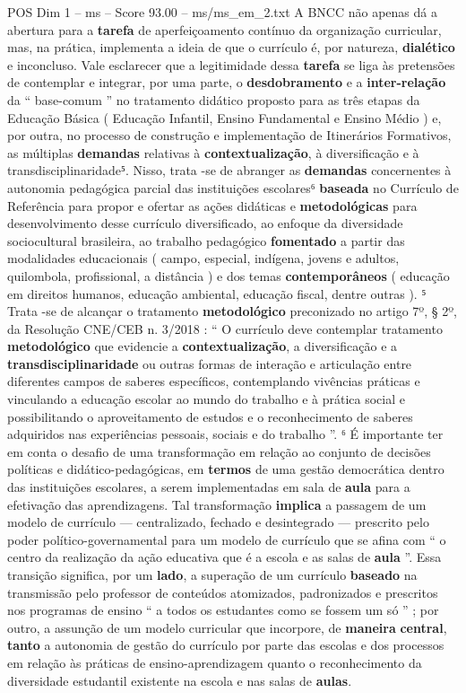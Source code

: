 \begin{textsample}{POS Dim 1 – ms – Score 93.00 – ms/ms\_em\_2.txt}
A BNCC não apenas dá a abertura para a \textbf{tarefa} de aperfeiçoamento contínuo da organização curricular, mas, na prática, implementa a ideia de que o currículo é, por natureza, \textbf{dialético} e inconcluso.
Vale esclarecer que a legitimidade dessa \textbf{tarefa} se liga às pretensões de contemplar e integrar, por uma parte, o \textbf{desdobramento} e a \textbf{inter-relação} da “ base-comum ” no tratamento didático proposto para as três etapas da Educação Básica ( Educação Infantil, Ensino Fundamental e Ensino Médio ) e, por outra, no processo de construção e implementação de Itinerários Formativos, as múltiplas \textbf{demandas} relativas à \textbf{contextualização}, à diversificação e à transdisciplinaridade⁵.
Nisso, trata -se de abranger as \textbf{demandas} concernentes à autonomia pedagógica parcial das instituições escolares⁶ \textbf{baseada} no Currículo de Referência para propor e ofertar as ações didáticas e \textbf{metodológicas} para desenvolvimento desse currículo diversificado, ao enfoque da diversidade sociocultural brasileira, ao trabalho pedagógico \textbf{fomentado} a partir das modalidades educacionais ( campo, especial, indígena, jovens e adultos, quilombola, profissional, a distância ) e dos temas \textbf{contemporâneos} ( educação em direitos humanos, educação ambiental, educação fiscal, dentre outras ). ⁵ Trata -se de alcançar o tratamento \textbf{metodológico} preconizado no artigo 7º, § 2º, da Resolução CNE/CEB n. 3/2018 : “ O currículo deve contemplar tratamento \textbf{metodológico} que evidencie a \textbf{contextualização}, a diversificação e a \textbf{transdisciplinaridade} ou outras formas de interação e articulação entre diferentes campos de saberes específicos, contemplando vivências práticas e vinculando a educação escolar ao mundo do trabalho e à prática social e possibilitando o aproveitamento de estudos e o reconhecimento de saberes adquiridos nas experiências pessoais, sociais e do trabalho ”. ⁶ É importante ter em conta o desafio de uma transformação em relação ao conjunto de decisões políticas e didático-pedagógicas, em \textbf{termos} de uma gestão democrática dentro das instituições escolares, a serem implementadas em sala de \textbf{aula} para a efetivação das aprendizagens.
Tal transformação \textbf{implica} a passagem de um modelo de currículo — centralizado, fechado e desintegrado — prescrito pelo poder político-governamental para um modelo de currículo que se afina com “ o centro da realização da ação educativa que é a escola e as salas de \textbf{aula} ”.
Essa transição significa, por um \textbf{lado}, a superação de um currículo \textbf{baseado} na transmissão pelo professor de conteúdos atomizados, padronizados e prescritos nos programas de ensino “ a todos os estudantes como se fossem um só ” ; por outro, a assunção de um modelo curricular que incorpore, de \textbf{maneira} \textbf{central}, \textbf{tanto} a autonomia de gestão do currículo por parte das escolas e dos processos em relação às práticas de ensino-aprendizagem quanto o reconhecimento da diversidade estudantil existente na escola e nas salas de \textbf{aulas}.

\end{textsample}
